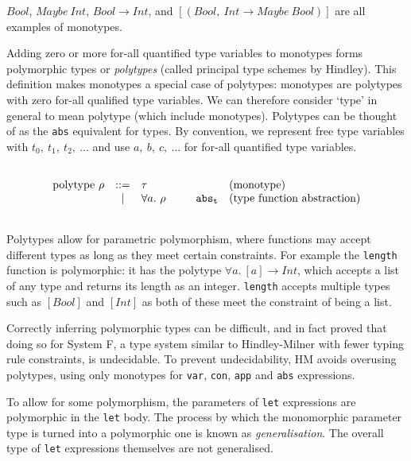 \documentclass[a4paper,fleqn,oneside,12pt]{report}
\begin{document}
$Bool$, $Maybe\ Int$, $Bool \rightarrow Int$, and $[(Bool,\ Int \rightarrow Maybe\ Bool)]$ are all examples of monotypes.

Adding zero or more for-all quantified type variables to monotypes forms polymorphic types or \textit{polytypes} (called principal type schemes by Hindley). This definition makes monotypes a special case of polytypes: monotypes are polytypes with zero for-all qualified type variables. We can therefore consider `type' in general to mean polytype (which include monotypes). Polytypes can be thought of as the \texttt{abs} equivalent for types. By convention, we represent free type variables with $t_0,\ t_1,\ t_2,\ \dots$ and use $a,\ b,\ c,\ \dots$ for for-all quantified type variables.

$$\begin{array}{lcllll}
  \\
    \textrm{polytype}\ \rho & ::= & \tau            & \hspace{0.25cm} & & \textrm{(monotype)}\\
                          & \vert & \forall a.\ \rho &                 & \mathtt{abs_t} & \textrm{(type function abstraction)}\\
  \\
\end{array}
$$

Polytypes allow for parametric polymorphism, where functions may accept different types as long as they meet certain constraints. For example the \texttt{length} function is polymorphic: it has the polytype $\forall a.\ [a] \rightarrow Int$, which accepts a list of any type and returns its length as an integer. \texttt{length} accepts multiple types such as $[Bool]$ and $[Int]$ as both of these meet the constraint of being a list.

Correctly inferring polymorphic types can be difficult, and in fact \cite{ref14} proved that doing so for System F, a type system similar to Hindley-Milner with fewer typing rule constraints, is undecidable. To prevent undecidability, HM avoids overusing polytypes, using only monotypes for \texttt{var}, \texttt{con}, \texttt{app} and \texttt{abs} expressions.

To allow for some polymorphism, the parameters of \texttt{let} expressions are polymorphic in the \texttt{let} body. The process by which the monomorphic parameter type is turned into a polymorphic one is known as \textit{generalisation}. The overall type of \texttt{let} expressions themselves are not generalised.
\end{document}
